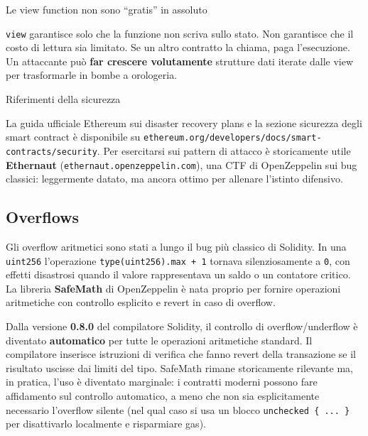 \documentclass[
  italian,
  openany]{book}
\begin{document}
\begin{calloutwarning}{Le view function non sono “gratis” in assoluto}

\texttt{view} garantisce solo che la funzione non scriva sullo stato.
Non garantisce che il costo di lettura sia limitato. Se un altro
contratto la chiama, paga l'esecuzione. Un attaccante può \textbf{far
crescere volutamente} strutture dati iterate dalle view per trasformarle
in bombe a orologeria.

\end{calloutwarning}

\begin{calloutnote}{Riferimenti della sicurezza}

La guida ufficiale Ethereum sui disaster recovery plans e la sezione
sicurezza degli smart contract è disponibile su
\texttt{ethereum.org/developers/docs/smart-contracts/security}. Per
esercitarsi sui pattern di attacco è storicamente utile
\textbf{Ethernaut} (\texttt{ethernaut.openzeppelin.com}), una CTF di
OpenZeppelin sui bug classici: leggermente datato, ma ancora ottimo per
allenare l'istinto difensivo.

\end{calloutnote}

\subsection{Overflows}\label{overflows}

Gli overflow aritmetici sono stati a lungo il bug più classico di
Solidity. In una \texttt{uint256} l'operazione
\texttt{type(uint256).max\ +\ 1} tornava silenziosamente a \texttt{0},
con effetti disastrosi quando il valore rappresentava un saldo o un
contatore critico. La libreria \textbf{SafeMath} di OpenZeppelin è nata
proprio per fornire operazioni aritmetiche con controllo esplicito e
revert in caso di overflow.

Dalla versione \textbf{0.8.0} del compilatore Solidity, il controllo di
overflow/underflow è diventato \textbf{automatico} per tutte le
operazioni aritmetiche standard. Il compilatore inserisce istruzioni di
verifica che fanno revert della transazione se il risultato uscisse dai
limiti del tipo. SafeMath rimane storicamente rilevante ma, in pratica,
l'uso è diventato marginale: i contratti moderni possono fare
affidamento sul controllo automatico, a meno che non sia esplicitamente
necessario l'overflow silente (nel qual caso si usa un blocco
\texttt{unchecked\ \{\ ...\ \}} per disattivarlo localmente e
risparmiare gas).
\end{document}
